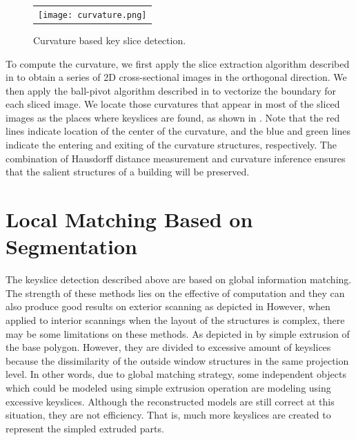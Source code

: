 \begin{figure}[htbp]
\begin{center}
\begin{tabular}{c}
\texttt{[image: curvature.png]}
\end{tabular}
\end{center}
\caption{ Curvature based key slice detection. }
\label{fig:KSD_Curv}
\end{figure}

To compute the curvature, we first apply the slice extraction algorithm
described in  to obtain a series of 2D cross-sectional
images in the orthogonal direction.
We then apply the ball-pivot algorithm described in  to
vectorize the boundary for each sliced image.
We locate those curvatures that appear in most of the sliced images as the
places where keyslices are found, as shown in .
Note that the red lines indicate location of the center of the curvature,
and the blue and green lines indicate the entering and exiting of the
curvature structures, respectively.
The combination of Hausdorff distance measurement and curvature inference
ensures that the salient structures of a building will be preserved.

\section{Local Matching Based on Segmentation}

The keyslice detection described above are based on global information matching.
The strength of these methods lies on the effective of computation and they can
also produce good results on exterior scanning as depicted in %
However, when applied to interior scannings when the layout of the structures 
is complex, there may be some limitations on these methods. 
As depicted in %
by simple extrusion of the base polygon. However, they are divided to 
excessive amount of keyslices because the dissimilarity of the outside window
structures in the same projection level. In other words, due to global matching
strategy, some independent objects which could be modeled using simple extrusion
operation are modeling using excessive keyslices. Although the reconstructed
models are still correct at this situation, they are not efficiency. That is, much
more keyslices are created to represent the simpled extruded parts. 

